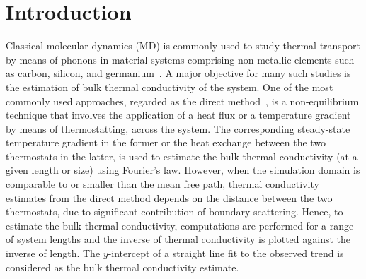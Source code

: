 \section{Introduction}
\label{sec:intro}

\begin{comment}
1. Background on use of MD simulations for thermal transport, preferred for studying
thermal transport by phononic interactions (refer notes from book suggested by Amuthan)


2. One approach to NEMD is the Direct Method, commonly used for estimating the bulk
thermal conductivity. A brief discussion on the direct method and associated pros and cons
(notes from Dellan's paper and book suggested by Amuthan) 
Predictions impacted by the choice of potential, values of
individual parameters, size, and potentially due to duration and applied temperature gradients
(cite Amuthan book, Francesco's paper, McGaughey's paper). 
Errors are introduced by thermostatting (Amuthan book). Nominal value of SW potential parameters
based on fitting against experiments and to ensure structural stability etc. (SW paper)

3. Motivate uncertainty analysis and briefly discuss and cite recent efforts (Francesco, Kirby,
Murthy). Highlight focus and key contributions of the present work and how it differs from
those efforts. 

4. Section-wise overview of the paper.  
\end{comment}

Classical molecular dynamics (MD) is commonly used to study thermal transport by means of
phonons in material systems comprising non-metallic elements such
as carbon, silicon, and germanium~\cite{Dumitrica:2010}. 
A major objective for many such studies is the
estimation of bulk thermal conductivity of the system. One of the most commonly used approaches,
regarded as the direct method~\cite{Schelling:2002,Turney:2009,Zhou:2009,Landry:2009,
McGaughey:2006,Ni:2009,Shi:2009,Wang:2009,Papanikolaou:2008}, is a non-equilibrium
technique that involves the application
of a heat flux or a temperature gradient by means of thermostatting, across the system. 
The corresponding steady-state temperature gradient in the former or the heat exchange between
the two thermostats in the latter, is used to estimate the bulk thermal conductivity (at a given
length or size) using 
Fourier's law. However, when the simulation domain is comparable to or smaller than the
mean free path, thermal conductivity estimates from the direct method depends on the
distance between the two thermostats, due to significant contribution of boundary scattering.
Hence, to estimate the bulk thermal conductivity, computations are performed for a range of
system lengths and the inverse
of thermal conductivity is plotted against the inverse of length. The $y$-intercept of a
straight line fit to the observed trend is considered as the bulk thermal conductivity 
estimate. 

